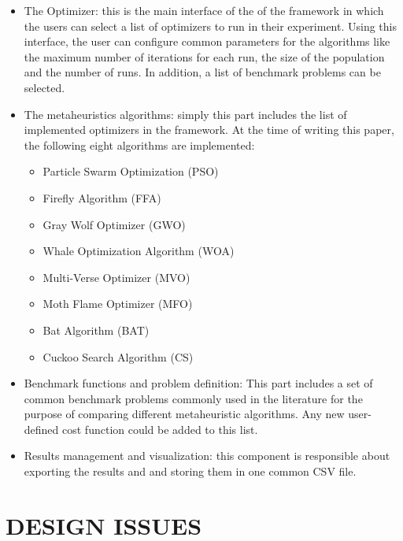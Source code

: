 \documentclass[a4paper,twoside]{article}
\begin{document}
\begin{itemize}
\item The Optimizer: this is the main interface of the of the framework in which the users can select a list of optimizers to run in their experiment. Using this interface, the user can configure common parameters for the algorithms like the maximum number of iterations for each run, the size of the population and the number of runs. In addition, a list of benchmark problems can be selected.

\item The metaheuristics algorithms: simply this part includes the list of implemented optimizers in the framework. At the time of writing this paper, the following eight algorithms are implemented:

\begin{itemize}
\item Particle Swarm Optimization (PSO)
\item  Firefly Algorithm (FFA) \cite{Yang2010FFA} 
\item Gray Wolf Optimizer (GWO)\cite{Mirjalili201446}
\item Whale Optimization Algorithm (WOA) \cite{Mirjalili201651}
\item Multi-Verse Optimizer (MVO) \cite{Mirjalili2016}
\item Moth Flame Optimizer (MFO) \cite{Mirjalili2015228}
\item Bat Algorithm (BAT) \cite{Yang2010}
\item Cuckoo Search Algorithm (CS) \cite{Yang2009}
\end{itemize}



\item Benchmark functions and problem definition: This part includes a set of common benchmark problems commonly used in the literature for the purpose of comparing different metaheuristic algorithms. Any new user-defined cost function could be added to this list.

\item Results management and visualization: this component is responsible about exporting the results and and storing them in one common CSV file. 
\end{itemize}


\section{\uppercase{Design issues}}
\end{document}
